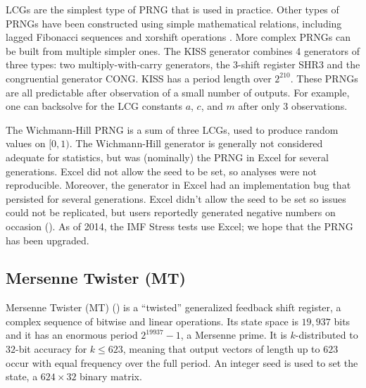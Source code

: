 \documentclass[graybox]{svmult}
\newcommand{\todo}[1]{{\color{red}{TO DO: \sc #1}}}
\begin{document}
LCGs are the simplest type of PRNG that is used in practice.
Other types of PRNGs have been constructed using simple mathematical relations,
including lagged Fibonacci sequences and xorshift operations \todo{CITE}.
More complex PRNGs can be built from multiple simpler ones.
The KISS generator combines 4 generators of three types: two multiply-with-carry
generators, the 3-shift register SHR3 and the congruential generator CONG.
KISS has a period length over $2^{210}$.
These PRNGs are all predictable after observation of a small number of outputs.
For example, one can backsolve for the LCG constants $a$, $c$, and $m$ after only 3 observations.

The Wichmann-Hill PRNG is a sum of three LCGs, used to produce random values on $[0, 1)$.
%
The Wichmann-Hill generator is generally not considered adequate for statistics, but was (nominally) the PRNG in Excel for several generations. 
Excel did not allow the seed to be set, so analyses were not reproducible.
Moreover, the generator in Excel had an implementation bug that persisted for several generations.
Excel didn't allow the seed to be set so issues could not be replicated, but users reportedly generated negative numbers on occasion (\cite{mccullough_microsoft_2008}).
As of 2014, the IMF Stress tests use Excel; we hope that the PRNG has been upgraded.
\todo{@Philip: is there a citation for this?}

\subsection{Mersenne Twister (MT)}

Mersenne Twister (MT) (\cite{matsumoto_mersenne_1998}) is a ``twisted'' generalized feedback shift register, a complex sequence of bitwise and linear operations.
Its state space is $19,937$ bits and it has an enormous period $2^{19937}-1$, a Mersenne prime.
It is $k$-distributed to $32$-bit accuracy for $k \leq 623$, meaning that output vectors of length up to $623$ occur with equal frequency over the full period.
An integer seed is used to set the state, a $624 \times 32$ binary matrix.
\end{document}
